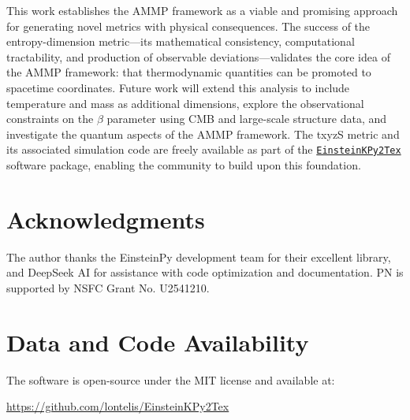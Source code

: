 \documentclass[11pt,a4paper]{article}
\begin{document}
This work establishes the AMMP framework as a viable and promising approach 
for generating novel metrics with physical consequences. The success of the 
entropy-dimension metric—its mathematical consistency, computational 
tractability, and production of observable deviations—validates the core 
idea of the AMMP framework: that thermodynamic quantities can be promoted 
to spacetime coordinates. Future work will extend this analysis to include 
temperature and mass as additional dimensions, explore the observational 
constraints on the $\beta$ parameter using CMB and large-scale structure 
data, and investigate the quantum aspects of the AMMP framework. The 
txyzS metric and its associated simulation code are freely available as 
part of the \href{https://github.com/lontelis/Einsteinpy_to_latex}{{\color{cyan}\texttt{EinsteinKPy2Tex}}}  
software package, enabling the community to 
build upon this foundation.

\section*{Acknowledgments}

The author thanks the EinsteinPy development team for their excellent library, and DeepSeek AI for assistance with code optimization and documentation.
PN is supported by NSFC Grant No. U2541210.

\section*{Data and Code Availability}

The software is open-source under the MIT license and available at:

\url{https://github.com/lontelis/EinsteinKPy2Tex}



\end{document}
